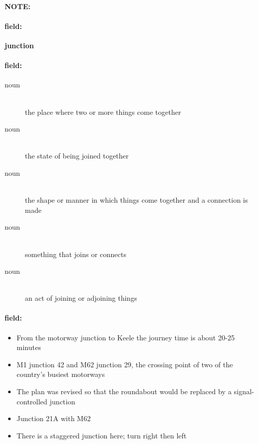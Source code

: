 \documentclass[12pt]{article}
\newenvironment{note}{\paragraph{NOTE:}}{}
\newenvironment{field}{\paragraph{field:}}{}
\begin{document}
\begin{note}
\begin{field}
\textbf{\large junction}
\end{field}


\begin{field}
\begin{description}
\item[noun] \hfill \\ 
the place where two or more things come together

\item[noun] \hfill \\ 
the state of being joined together

\item[noun] \hfill \\ 
the shape or manner in which things come together and a connection is made

\item[noun] \hfill \\ 
something that joins or connects

\item[noun] \hfill \\ 
an act of joining or adjoining things

\end{description}
\end{field}

\begin{field}
\begin{itemize}
\item From the motorway junction to Keele the journey time is about 20-25 minutes
\item M1 junction 42 and M62 junction 29, the crossing point of two of the country's busiest motorways
\item The plan was revised so that the roundabout would be replaced by a signal-controlled junction
\item Junction 21A with M62
\item There is a staggered junction here; turn right then left
\end{itemize}
\end{field}
\end{note}
\end{document}
